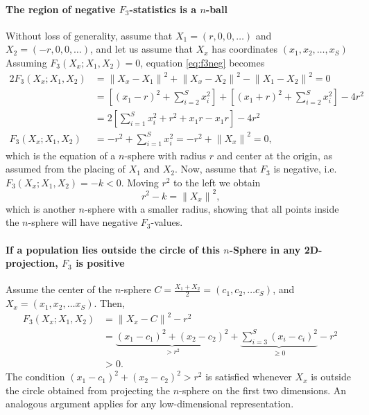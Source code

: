 \documentclass[12pt,fullpage, a4paper]{article}
\newcommand{\normsq}[1]{\left\lVert#1\right\rVert^2}
\begin{document}
\paragraph{The region of negative $F_3$-statistics is a $n$-ball}
Without loss of generality, assume that $X_1 = (r, 0, 0, \dots)$ and $X_2 = (-r, 0, 0, \dots)$, and let us assume that $X_x$ has coordinates $(x_1, x_2, \dots, x_S)$ Assuming $F_3(X_x; X_1, X_2) = 0$, equation \ref{eq:f3neg} becomes
\begin{align}
2 F_3(X_x; X_1, X_2) &=  \normsq{X_x - X_1} + \normsq{X_x - X_2}  - \normsq{X_1 - X_2} = 0 \nonumber\\
&= \left[(x_1-r)^2 + \sum_{i=2}^S x_i^2\right] + \left[(x_1 + r)^2 + \sum_{i=2}^S x_i^2\right] - 4r^2 \nonumber\\
&= 2 \left[\sum_{i=1}^S x_i^2 + r^2 + x_1r - x_1r\right] - 4r^2\nonumber\\
F_3(X_x; X_1, X_2) & = -r^2 + \sum_{i=1}^S x_i^2 = -r^2 + \normsq{X_x} = 0  \text{,} \label{eq:f3sphere}
\end{align}
which is the equation of a $n$-sphere with radius $r$ and center at the origin, as assumed from the placing of $X_1$ and $X_2$. Now, assume that $F_3$ is negative, i.e. $F_3(X_x; X_1, X_2) = -k < 0$. Moving $r^2$ to the left we obtain
\begin{equation}
r^2 - k = \normsq{X_x} \text{,}
\end{equation}
which is another $n$-sphere with a smaller radius, showing that all points inside the $n$-sphere will have negative $F_3$-values.

\paragraph{If a population lies outside the circle of this $n$-Sphere in any 2D-projection, $F_3$ is positive} 
Assume the center of the $n$-sphere $C = \frac{X_1 + X_2}{2} = (c_1, c_2, \dots c_S)$, and $X_x = (x_1, x_2, \dots x_S)$.  Then, 
\begin{align}
F_3(X_x; X_1, X_2) &= \normsq{X_x - C} - r^2 \nonumber\\
&= \underbrace{(x_1 - c_1)^2 + (x_2 - c_2)^2}_{>r^2} + \underbrace{\sum_{i=3}^S (x_i - c_i)^2}_{\geq 0} - r^2 \nonumber\\
& > 0 \text{.}\label{eq:f3circle}
\end{align}
The condition $(x_1 - c_1)^2 + (x_2 - c_2)^2 >r^2$ is satisfied whenever $X_x$ is outside the circle obtained from projecting the $n$-sphere on the first two dimensions. An analogous argument applies for any low-dimensional representation.



\end{document}
